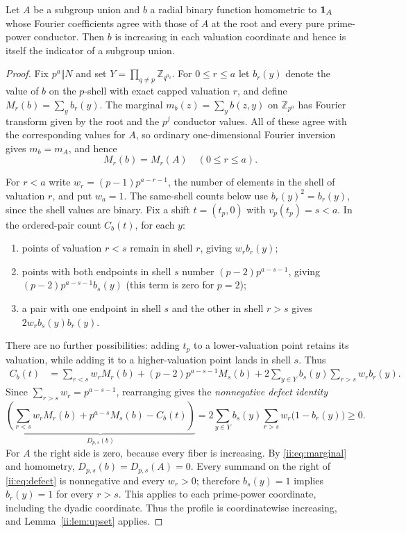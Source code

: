 \begin{lemma}\label{ii:lem:defect}
Let $A$ be a subgroup union and $b$ a radial binary function homometric to $\mathbf 1_A$ whose Fourier coefficients agree with those of $A$ at the root and every pure prime-power conductor.  Then $b$ is increasing in each valuation coordinate and hence is itself the indicator of a subgroup union.
\end{lemma}
\begin{proof}
Fix $p^a\Vert N$ and set $Y=\prod_{q\ne p}\mathbb Z_{q^{a_q}}$.  For $0\le r\le a$ let $b_r(y)$ denote the value of $b$ on the $p$-shell with exact capped valuation $r$, and define $M_r(b)=\sum_y b_r(y)$.  The marginal $m_b(z)=\sum_y b(z,y)$ on $\mathbb Z_{p^a}$ has Fourier transform given by the root and the $p^j$ conductor values.  All of these agree with the corresponding values for $A$, so ordinary one-dimensional Fourier inversion gives $m_b=m_A$, and hence
\begin{equation}\label{ii:eq:marginal}
 M_r(b)=M_r(A)\quad(0\le r\le a).
\end{equation}

For $r<a$ write $w_r=(p-1)p^{a-r-1}$, the number of elements in the shell of valuation $r$, and put $w_a=1$.  The same-shell counts below use $b_r(y)^2=b_r(y)$, since the shell values are binary.  Fix a shift $t=(t_p,0)$ with $v_p(t_p)=s<a$.  In the ordered-pair count $C_b(t)$, for each $y$:
\begin{enumerate}[label=(\roman*),nosep]
 \item points of valuation $r<s$ remain in shell $r$, giving $w_rb_r(y)$;
 \item points with both endpoints in shell $s$ number $(p-2)p^{a-s-1}$, giving $(p-2)p^{a-s-1}b_s(y)$ (this term is zero for $p=2$);
 \item a pair with one endpoint in shell $s$ and the other in shell $r>s$ gives $2w_rb_s(y)b_r(y)$.
\end{enumerate}
There are no further possibilities: adding $t_p$ to a lower-valuation point retains its valuation, while adding it to a higher-valuation point lands in shell $s$.  Thus
\begin{align}
 C_b(t)&=\sum_{r<s}w_rM_r(b)+(p-2)p^{a-s-1}M_s(b)
          +2\sum_{y\in Y}b_s(y)\sum_{r>s}w_rb_r(y).\label{ii:eq:shellcorr}
\end{align}
Since $\sum_{r>s}w_r=p^{a-s-1}$, rearranging gives the \emph{nonnegative defect identity}
\begin{equation}\label{ii:eq:defect}
 \underbrace{\left(\sum_{r<s}w_rM_r(b)+p^{a-s}M_s(b)-C_b(t)\right)}_{D_{p,s}(b)}
 =2\sum_{y\in Y}b_s(y)\sum_{r>s}w_r\bigl(1-b_r(y)\bigr)\ge0.
\end{equation}
For $A$ the right side is zero, because every fiber is increasing.  By \eqref{ii:eq:marginal} and homometry, $D_{p,s}(b)=D_{p,s}(A)=0$.  Every summand on the right of \eqref{ii:eq:defect} is nonnegative and every $w_r>0$; therefore $b_s(y)=1$ implies $b_r(y)=1$ for every $r>s$.  This applies to each prime-power coordinate, including the dyadic coordinate. Thus the profile is coordinatewise increasing, and Lemma~\ref{ii:lem:upset} applies.\qedhere
\end{proof}

